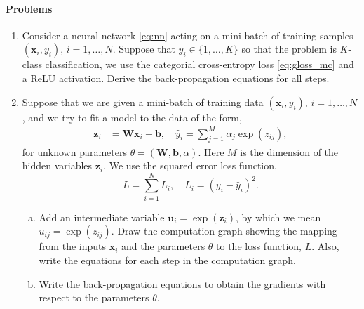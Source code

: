 \documentclass[11pt]{article}
\newcommand{\bbf}{\mathbf{b}}
\newcommand{\ubf}{\mathbf{u}}
\newcommand{\xbf}{\mathbf{x}}
\newcommand{\zbf}{\mathbf{z}}
\newcommand{\Wbf}{\mathbf{W}}
\begin{document}
\paragraph*{Problems}
\begin{enumerate}
\item Consider a neural network \eqref{eq:nn} acting on
a mini-batch of training samples $(\xbf_i,y_i)$, $i=1,\ldots,N$.  Suppose that $y_i \in \{1,\ldots,K\}$ so that the problem
is $K$-class classification, we use the categorial cross-entropy loss \eqref{eq:gloss_mc} and a ReLU activation.
Derive the back-propagation equations for all steps.

\item \label{prob:cg_exp}
Suppose that we are given a mini-batch of training data $(\xbf_i,y_i)$, $i=1,\ldots,N$,
and we try to fit a model to the data of the form,
\begin{align*}
    \zbf_i    &= \Wbf\xbf_i + \bbf, \quad
    \hat{y}_i = \sum_{j=1}^M \alpha_j\exp(z_{ij}),
\end{align*}
for unknown parameters $\theta=(\Wbf,\bbf,\alpha)$.  Here $M$ is the dimension
of the hidden variables $\zbf_i$.  We use the squared error loss function,
\[
    L = \sum_{i=1}^N L_i, \quad L_i = (y_i-\hat{y}_i)^2.
\]
\begin{enumerate}[(a)]
\item Add an intermediate variable $\ubf_i = \exp(\zbf_i)$, by which we mean
$u_{ij} = \exp(z_{ij})$.  Draw the computation graph showing the mapping
from the inputs $\xbf_i$ and the parameters $\theta$ to the loss function, $L$.
Also, write the equations for each step in the computation graph.

\item Write the back-propagation equations to obtain the
gradients with respect to the parameters $\theta$.
\end{enumerate}


\end{enumerate}
\end{document}
